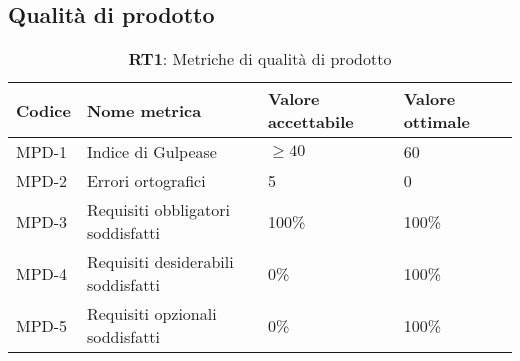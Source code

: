 \subsection{Qualità di prodotto}
\label{sec:Qualità di prodotto}
\begin{table}[h!]
    \centering
    \renewcommand{\arraystretch}{1.5} %
    \begin{tabularx}{\textwidth}{|X|X|X|X|}\hline
    \rowcolor[HTML]{FFD700}
    \textbf{Codice} & \textbf{Nome metrica} & \textbf{Valore accettabile} & \textbf{Valore ottimale} \\ \hline
    MPD-1 & Indice di Gulpease & \( \geq 40 \) & 60 \\ \hline
    MPD-2 & Errori ortografici & 5 & 0 \\ \hline
    MPD-3 & Requisiti obbligatori soddisfatti & 100\%  & 100\%\\ \hline
    MPD-4 & Requisiti desiderabili soddisfatti & 0\% & 100\%\\ \hline
    MPD-5 & Requisiti opzionali soddisfatti & 0\% & 100\% \\ \hline

    \end{tabularx}
    \caption{\textbf{RT1}: Metriche di qualità di prodotto}
\end{table}